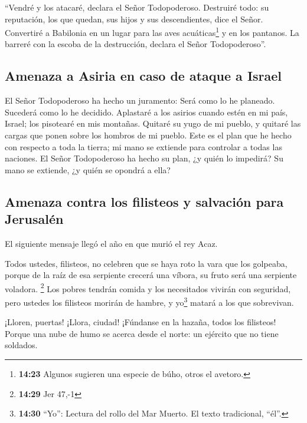  ``Vendré y los atacaré, declara el Señor Todopoderoso.
Destruiré todo: su reputación, los que quedan, sus hijos y sus
descendientes, dice el Señor.  Convertiré a Babilonia en
un lugar para las aves acuáticas\footnote{\textbf{14:23} Algunos
  sugieren una especie de búho, otros el avetoro.} y en los pantanos. La
barreré con la escoba de la destrucción, declara el Señor
Todopoderoso''.

\hypertarget{amenaza-a-asiria-en-caso-de-ataque-a-israel}{%
\subsection{Amenaza a Asiria en caso de ataque a
Israel}\label{amenaza-a-asiria-en-caso-de-ataque-a-israel}}

 El Señor Todopoderoso ha hecho un juramento: Será como
lo he planeado. Sucederá como lo he decidido.  Aplastaré
a los asirios cuando estén en mi país, Israel; los pisotearé en mis
montañas. Quitaré su yugo de mi pueblo, y quitaré las cargas que ponen
sobre los hombros de mi pueblo.  Este es el plan que he
hecho con respecto a toda la tierra; mi mano se extiende para controlar
a todas las naciones.  El Señor Todopoderoso ha hecho su
plan, ¿y quién lo impedirá? Su mano se extiende, ¿y quién se opondrá a
ella?

\hypertarget{amenaza-contra-los-filisteos-y-salvaciuxf3n-para-jerusaluxe9n}{%
\subsection{Amenaza contra los filisteos y salvación para
Jerusalén}\label{amenaza-contra-los-filisteos-y-salvaciuxf3n-para-jerusaluxe9n}}

 El siguiente mensaje llegó el año en que murió el rey
Acaz.

 Todos ustedes, filisteos, no celebren que se haya roto
la vara que los golpeaba, porque de la raíz de esa serpiente crecerá una
víbora, su fruto será una serpiente voladora. \footnote{\textbf{14:29}
  Jer 47,-1}  Los pobres tendrán comida y los necesitados
vivirán con seguridad, pero ustedes los filisteos morirán de hambre, y
yo\footnote{\textbf{14:30} ``Yo'': Lectura del rollo del Mar Muerto. El
  texto tradicional, ``él''.} matará a los que sobrevivan.

 ¡Lloren, puertas! ¡Llora, ciudad! ¡Fúndanse en la
hazaña, todos los filisteos! Porque una nube de humo se acerca desde el
norte: un ejército que no tiene soldados.

